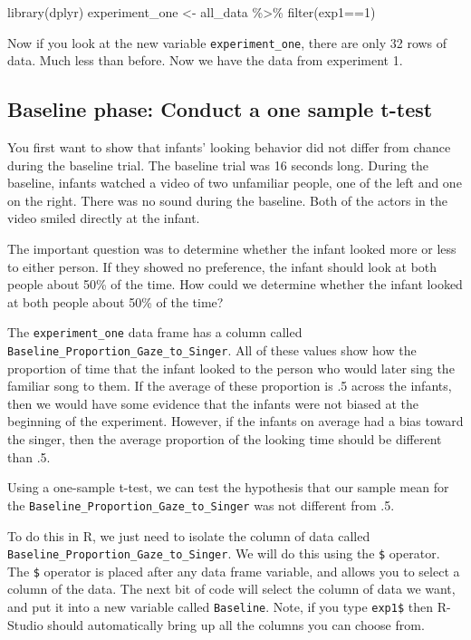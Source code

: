 \documentclass[
]{book}
\newenvironment{Shaded}{\begin{snugshade}}{\end{snugshade}}
\newcommand{\DecValTok}[1]{\textcolor[rgb]{0.00,0.00,0.81}{#1}}
\newcommand{\FunctionTok}[1]{\textcolor[rgb]{0.00,0.00,0.00}{#1}}
\newcommand{\NormalTok}[1]{#1}
\newcommand{\OtherTok}[1]{\textcolor[rgb]{0.56,0.35,0.01}{#1}}
\newcommand{\SpecialCharTok}[1]{\textcolor[rgb]{0.00,0.00,0.00}{#1}}
\begin{document}
\begin{Shaded}
\begin{Highlighting}[]
\FunctionTok{library}\NormalTok{(dplyr)}
\NormalTok{experiment\_one }\OtherTok{\textless{}{-}}\NormalTok{ all\_data }\SpecialCharTok{\%\textgreater{}\%} \FunctionTok{filter}\NormalTok{(exp1}\SpecialCharTok{==}\DecValTok{1}\NormalTok{)}
\end{Highlighting}
\end{Shaded}

Now if you look at the new variable \texttt{experiment\_one}, there are only 32 rows of data. Much less than before. Now we have the data from experiment 1.

\hypertarget{baseline-phase-conduct-a-one-sample-t-test}{%
\subsection{Baseline phase: Conduct a one sample t-test}\label{baseline-phase-conduct-a-one-sample-t-test}}

You first want to show that infants' looking behavior did not differ from chance during the baseline trial. The baseline trial was 16 seconds long. During the baseline, infants watched a video of two unfamiliar people, one of the left and one on the right. There was no sound during the baseline. Both of the actors in the video smiled directly at the infant.

The important question was to determine whether the infant looked more or less to either person. If they showed no preference, the infant should look at both people about 50\% of the time. How could we determine whether the infant looked at both people about 50\% of the time?

The \texttt{experiment\_one} data frame has a column called \texttt{Baseline\_Proportion\_Gaze\_to\_Singer}. All of these values show how the proportion of time that the infant looked to the person who would later sing the familiar song to them. If the average of these proportion is .5 across the infants, then we would have some evidence that the infants were not biased at the beginning of the experiment. However, if the infants on average had a bias toward the singer, then the average proportion of the looking time should be different than .5.

Using a one-sample t-test, we can test the hypothesis that our sample mean for the \texttt{Baseline\_Proportion\_Gaze\_to\_Singer} was not different from .5.

To do this in R, we just need to isolate the column of data called \texttt{Baseline\_Proportion\_Gaze\_to\_Singer}. We will do this using the \texttt{\$} operator. The \texttt{\$} operator is placed after any data frame variable, and allows you to select a column of the data. The next bit of code will select the column of data we want, and put it into a new variable called \texttt{Baseline}. Note, if you type \texttt{exp1\$} then R-Studio should automatically bring up all the columns you can choose from.
\end{document}

